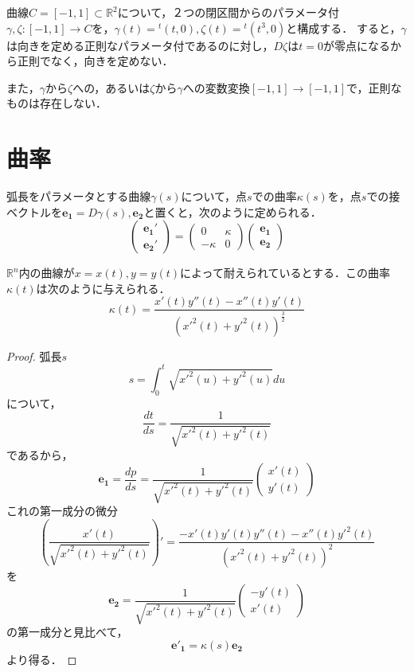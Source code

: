 \documentclass[uplatex, dvipdfmx]{jsreport}
\begin{document}
\begin{example}[スカラー場の変数変換]
    曲線$C=[-1,1]\subset\mathbb{R}^2$について，２つの閉区間からのパラメータ付$\gamma,\zeta:[-1,1]\to C$を，$\gamma(t)={}^t\!(t,0), \zeta(t)={}^t\!(t^3,0)$と構成する．
    すると，$\gamma$は向きを定める正則なパラメータ付であるのに対し，$D\zeta$は$t=0$が零点になるから正則でなく，向きを定めない．

    また，$\gamma$から$\zeta$への，あるいは$\zeta$から$\gamma$への変数変換$[-1,1]\to [-1,1]$で，正則なものは存在しない．
\end{example}

\section{曲率}

\begin{definition}
    弧長をパラメータとする曲線$\gamma(s)$について，点$s$での曲率$\kappa(s)$を，点$s$での接ベクトルを$\mathbf{e_1}=D\gamma(s),\mathbf{e_2}$と置くと，次のように定められる．
    \[ \left(\begin{array}{c}\mathbf{e_1}'  \\ \mathbf{e_2}'\end{array}\right) = \left(\begin{array}{cc}0&\kappa \\ -\kappa&0\end{array}\right)\left(\begin{array}{c}\mathbf{e_1} \\ \mathbf{e_2}\end{array}\right) \]
\end{definition}
\begin{proposition}[曲線の曲率]
    $\mathbb{R}^n$内の曲線が$x=x(t), y=y(t)$によって耐えられているとする．この曲率$\kappa(t)$は次のように与えられる．
    \[ \kappa(t)=\frac{x'(t)y''(t)-x''(t)y'(t)}{({x'}^2(t)+{y'}^2(t))^\frac{3}{2}} \]
\end{proposition}
\begin{proof}
    弧長$s$
    \[ s=\int^t_0\sqrt{{x'}^2(u)+{y'}^2(u)}du \]
    について，
    \[ \frac{dt}{ds} = \frac{1}{\sqrt{{x'}^2(t)+{y'}^2(t)}} \]
    であるから，
    \[ \mathbf{e_1}=\frac{dp}{ds} = \frac{1}{\sqrt{{x'}^2(t)+{y'}^2(t)}}\left(\begin{array}{c}x'(t) \\ y'(t)\end{array}\right) \]
    これの第一成分の微分
    \[ \left(\frac{x'(t)}{\sqrt{{x'}^2(t)+{y'}^2(t)}}\right)' =  \frac{-x'(t)y'(t)y''(t)-x''(t){y'}^2(t)}{({x'}^2(t)+{y'}^2(t))^2} \]
    を
    \[ \mathbf{e_2}=\frac{1}{\sqrt{{x'}^2(t)+{y'}^2(t)}}\left(\begin{array}{c}-y'(t) \\x'(t)\end{array}\right) \]
    の第一成分と見比べて，
    \[\mathbf{{e'}_1}=\kappa(s)\mathbf{e_2}\]
    より得る．
\end{proof}
\end{document}
